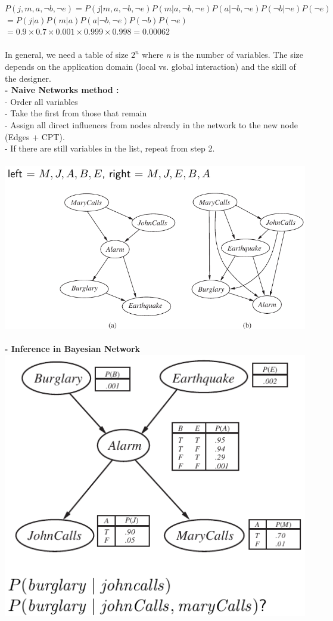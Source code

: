 \documentclass{article}
\begin{document}
$P(j,m,a,¬b,¬e) = P(j|m,a,¬b,¬e)P(m|a,¬b,¬e)P(a|¬b,¬e)P(¬b|¬e)P(¬e)$\\
$=P(j|a)P(m|a)P(a|¬b,¬e)P(¬b)P(¬e)$\\
$= 0.9 × 0.7 × 0.001 × 0.999 × 0.998 = 0.00062$\\\\
In general, we need a table of size $2^n$ where \textit{n} is the number of variables. The size depends on the application domain (local vs. global
interaction) and the skill of the designer.\\
\textbf{- Naive Networks method :}\\
    - Order all variables\\
    - Take the first from those that remain\\
    - Assign all direct influences from nodes already in the network to the new node (Edges + CPT).\\
    - If there are still variables in the list, repeat from step 2.\\\\
\includegraphics[scale=0.4]{70.png} \\\\
\textbf{- Inference in Bayesian Network}\\
\includegraphics[scale=0.4]{71.png} \\\\
\end{document}
